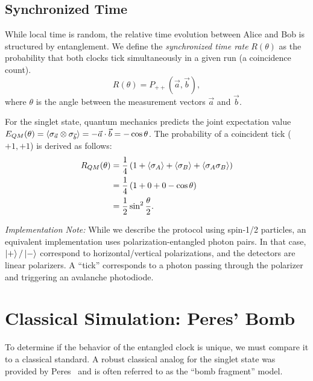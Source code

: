 \documentclass[entropy,article,submit,moreauthors,pdftex]{Definitions/mdpi}
\begin{document}
\subsection{Synchronized Time}

While local time is random, the relative time evolution between Alice and Bob is structured by entanglement. We define the \emph{synchronized time rate} $R(\theta)$ as the probability that both clocks tick simultaneously in a given run (a coincidence count).
\begin{equation}
R(\theta) = P_{++}(\vec{a}, \vec{b}),
\end{equation}
where $\theta$ is the angle between the measurement vectors $\vec{a}$ and $\vec{b}$.

For the singlet state, quantum mechanics predicts the joint expectation value $E_{QM}(\theta) = \braket{\sigma_{\vec{a}} \otimes \sigma_{\vec{b}}} = -\vec{a}\cdot\vec{b} = -\cos\theta$. The probability of a coincident tick ($+1, +1$) is derived as follows:
\begin{align}
R_{QM}(\theta) &= \frac{1}{4} \left( 1 + \braket{\sigma_A} + \braket{\sigma_B} + \braket{\sigma_A \sigma_B} \right) \nonumber \\
&= \frac{1}{4} \left( 1 + 0 + 0 - \cos\theta \right) \nonumber \\
&= \frac{1}{2}\sin^2\frac{\theta}{2}.
\label{eq:qm_rate}
\end{align}

\textit{Implementation Note:} While we describe the protocol using spin-1/2 particles, an equivalent implementation uses polarization-entangled photon pairs. In that case, $\ket{+}/\ket{-}$ correspond to horizontal/vertical polarizations, and the detectors are linear polarizers. A ``tick'' corresponds to a photon passing through the polarizer and triggering an avalanche photodiode.

\section{Classical Simulation: Peres' Bomb}

To determine if the behavior of the entangled clock is unique, we must compare it to a classical standard. A robust classical analog for the singlet state was provided by Peres~\cite{peres222} and is often referred to as the ``bomb fragment'' model.
\end{document}
